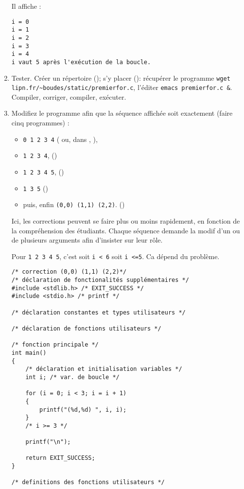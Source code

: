 \begin{enumerate}
\begin{correction}
Il affiche :
\begin{verbatim}
i = 0
i = 1
i = 2
i = 3
i = 4
i vaut 5 après l'exécution de la boucle.
\end{verbatim}
\end{correction}
\item Tester. Créer un répertoire ();
s'y placer (): récupérer le programme
\verb|wget lipn.fr/~boudes/static/premierfor.c|, l'éditer
\verb|emacs premierfor.c &|. Compiler,
corriger, compiler, exécuter.

\item Modifiez le programme afin que la séquence affichée soit
  exactement (faire cinq programmes) :
  \begin{itemize}
  \item \verb|0 1 2 3 4| ( ou, dans
    , ),
  \item \verb|1 2 3 4|, ()
  \item \verb|1 2 3 4 5|, ()
  \item \verb|1 3 5| ()
  \item puis, enfin \verb|(0,0) (1,1) (2,2)|. ()
  \end{itemize}
  \begin{correction}
    Ici, les corrections peuvent se faire plus ou moins rapidement, en
    fonction de la compréhension des étudiants. Chaque séquence
    demande la modif d'un ou de plusieurs arguments afin d'insister
    sur leur rôle.

Pour \verb|1 2 3 4 5|, c'est soit \verb|i < 6| soit \verb|i <=5|. Ca dépend du problème.
\begin{verbatim}
/* correction (0,0) (1,1) (2,2)*/
/* déclaration de fonctionalités supplémentaires */
#include <stdlib.h> /* EXIT_SUCCESS */
#include <stdio.h> /* printf */

/* déclaration constantes et types utilisateurs */

/* déclaration de fonctions utilisateurs */

/* fonction principale */
int main()
{
    /* déclaration et initialisation variables */
    int i; /* var. de boucle */

    for (i = 0; i < 3; i = i + 1)
    {
        printf("(%d,%d) ", i, i);
    }
    /* i >= 3 */

    printf("\n");

    return EXIT_SUCCESS;
}

/* definitions des fonctions utilisateurs */
\end{verbatim}


\end{correction}
\end{enumerate}
